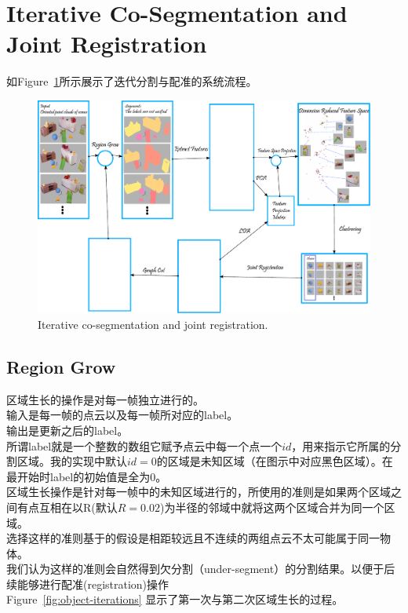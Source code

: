 \section{Iterative Co-Segmentation and Joint Registration}
\label{sec:segmentation}

如Figure~\ref{fig:iterative-segmentation-registration}所示展示了迭代分割与配准的系统流程。
\begin{figure}
	\includegraphics[width=1.0\textwidth]{figures/hsy/overview}
	\caption{Iterative co-segmentation and joint registration.}
	\label{fig:iterative-segmentation-registration}
\end{figure}
\subsection{Region Grow}
区域生长的操作是对每一帧独立进行的。\\
输入是每一帧的点云以及每一帧所对应的label。\\
输出是更新之后的label。 \\
所谓label就是一个整数的数组它赋予点云中每一个点一个$id$，用来指示它所属的分割区域。我的实现中默认$id=0$的区域是未知区域（在图示中对应黑色区域）。在最开始时label的初始值是全为0。\\
区域生长操作是针对每一帧中的未知区域进行的，所使用的准则是如果两个区域之间有点互相在以R(默认$R=0.02$)为半径的邻域中就将这两个区域合并为同一个区域。\\
选择这样的准则基于的假设是相距较远且不连续的两组点云不太可能属于同一物体。\\
我们认为这样的准则会自然得到欠分割（under-segment）的分割结果。以便于后续能够进行配准(registration)操作\\
Figure~\ref{fig:object-iterations} 显示了第一次与第二次区域生长的过程。
